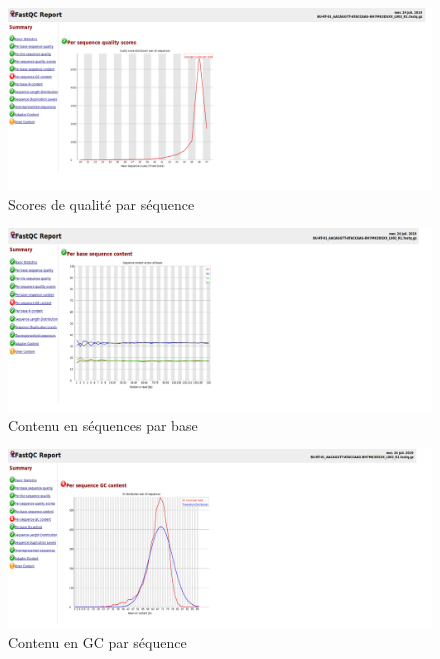 \documentclass[a4paper,11pt]{article}
\begin{document}
\begin{figure}
  \begin{center}
    \includegraphics[width=16cm]{Images/FastqcMetrics3_Sample1_R1}
  \end{center}
  \caption{Scores de qualité par séquence}
  \label{fig-FastqcMetrics3_Sample1_R1}
\end{figure}

\begin{figure}
  \begin{center}
    \includegraphics[width=16cm]{Images/FastqcMetrics4_Sample1_R1}
  \end{center}
  \caption{Contenu en séquences par base}
  \label{fig-FastqcMetrics4_Sample1_R1}
\end{figure}

\begin{figure}
  \begin{center}
    \includegraphics[width=16cm]{Images/FastqcMetrics5_Sample1_R1}
  \end{center}
  \caption{Contenu en GC par séquence}
  \label{fig-FastqcMetrics1_Sample5_R1}
\end{figure}
\end{document}
